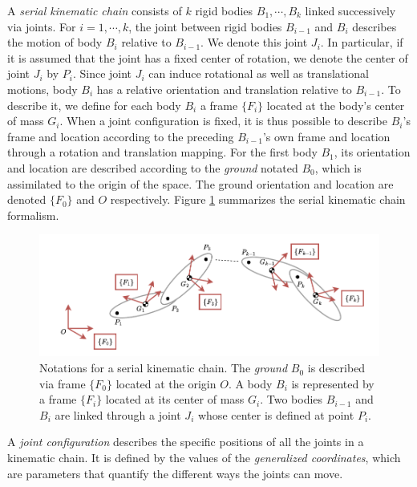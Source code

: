 A \emph{serial kinematic chain} consists of $k$ rigid bodies $B_1, \cdots, B_k$ linked successively via joints. For $i = 1, \cdots, k$, the joint between rigid bodies $B_{i-1}$ and $B_i$ describes the motion of body $B_i$ relative to $B_{i-1}$. We denote this joint $J_i$. In particular, if it is assumed that the joint has a fixed center of rotation, we denote the center of joint $J_i$ by $P_i$. Since joint $J_i$ can induce rotational as well as translational motions, body $B_i$ has a relative orientation and translation relative to $B_{i-1}$. To describe it, we define for each body $B_i$ a frame $\{F_i\}$ located at the body's center of mass $G_i$. When a joint configuration is fixed, it is thus possible to describe $B_i$'s frame and location according to the preceding $B_{i-1}$'s own frame and location through a rotation and translation mapping. For the first body $B_1$, its orientation and location are described according to the \emph{ground} notated $B_0$, which is assimilated to the origin of the space. The ground orientation and location are denoted $\{F_0\}$ and $O$ respectively. Figure \ref{fig:general_rigid_body_model} summarizes the serial kinematic chain formalism.
\begin{figure}[!htb]
    \captionsetup{justification=centering}
        \centering
        \includegraphics[trim={0 0 0 0},clip,width=1\linewidth]{img/chapter_4/general_rigid_body_model.pdf}
    \caption{Notations for a serial kinematic chain. The \emph{ground} $B_0$ is described via frame $\{F_0\}$ located at the origin $O$. A body $B_i$ is represented by a frame $\{F_i\}$ located at its center of mass $G_i$. Two bodies $B_{i-1}$ and $B_i$ are linked through a joint $J_i$ whose center is defined at point $P_i$. }
    \label{fig:general_rigid_body_model}
\end{figure}

A \emph{joint configuration} describes the specific positions of all the joints in a kinematic chain. It is defined by the values of the \emph{generalized coordinates}, which are parameters that quantify the different ways the joints can move.

